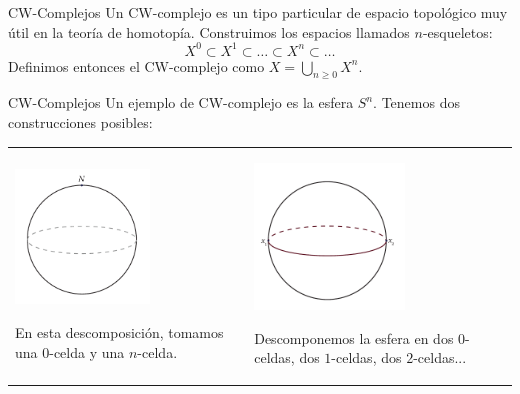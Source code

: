 \begin{frame}{CW-Complejos}
Un CW-complejo es un tipo particular de espacio topológico muy útil en la teoría de homotopía.
Construimos los espacios llamados $n$-esqueletos:
\[ X^0 \subset X^1 \subset \ldots \subset X^n \subset \ldots \]
 Definimos entonces el CW-complejo como $\displaystyle X = \bigcup_{n \geq 0} X^n$.
\end{frame}

\begin{frame}{CW-Complejos}
Un ejemplo de CW-complejo es la esfera $S^n$. Tenemos dos construcciones posibles:
\begin{tabular}{ll}
\begin{minipage}{0.5\textwidth}
\centering
\includegraphics[width = 0.6\textwidth]{images/cwesfera1}
\par
En esta descomposición, tomamos una $0$-celda y una $n$-celda.
\end{minipage}
& \pause
\begin{minipage}{0.5\textwidth}
\centering
\includegraphics[width = 0.6\textwidth]{images/cwesfera2}
\par
Descomponemos la esfera en dos $0$-celdas, dos $1$-celdas, dos $2$-celdas...
\end{minipage}
\end{tabular}
\end{frame}

